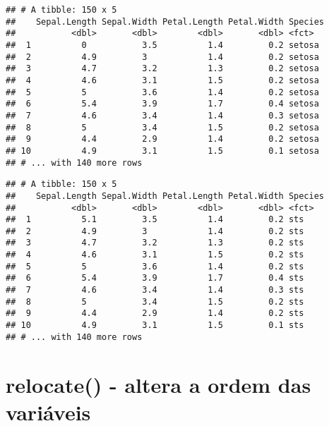 \documentclass[]{book}
\newenvironment{Shaded}{\begin{snugshade}}{\end{snugshade}}
\newcommand{\DataTypeTok}[1]{\textcolor[rgb]{0.13,0.29,0.53}{#1}}
\newcommand{\KeywordTok}[1]{\textcolor[rgb]{0.13,0.29,0.53}{\textbf{#1}}}
\newcommand{\NormalTok}[1]{#1}
\newcommand{\OperatorTok}[1]{\textcolor[rgb]{0.81,0.36,0.00}{\textbf{#1}}}
\newcommand{\StringTok}[1]{\textcolor[rgb]{0.31,0.60,0.02}{#1}}
\begin{document}
\begin{verbatim}
## # A tibble: 150 x 5
##    Sepal.Length Sepal.Width Petal.Length Petal.Width Species
##           <dbl>       <dbl>        <dbl>       <dbl> <fct>  
##  1          0           3.5          1.4         0.2 setosa 
##  2          4.9         3            1.4         0.2 setosa 
##  3          4.7         3.2          1.3         0.2 setosa 
##  4          4.6         3.1          1.5         0.2 setosa 
##  5          5           3.6          1.4         0.2 setosa 
##  6          5.4         3.9          1.7         0.4 setosa 
##  7          4.6         3.4          1.4         0.3 setosa 
##  8          5           3.4          1.5         0.2 setosa 
##  9          4.4         2.9          1.4         0.2 setosa 
## 10          4.9         3.1          1.5         0.1 setosa 
## # ... with 140 more rows
\end{verbatim}

\begin{Shaded}
\end{Shaded}

\begin{verbatim}
## # A tibble: 150 x 5
##    Sepal.Length Sepal.Width Petal.Length Petal.Width Species
##           <dbl>       <dbl>        <dbl>       <dbl> <fct>  
##  1          5.1         3.5          1.4         0.2 sts    
##  2          4.9         3            1.4         0.2 sts    
##  3          4.7         3.2          1.3         0.2 sts    
##  4          4.6         3.1          1.5         0.2 sts    
##  5          5           3.6          1.4         0.2 sts    
##  6          5.4         3.9          1.7         0.4 sts    
##  7          4.6         3.4          1.4         0.3 sts    
##  8          5           3.4          1.5         0.2 sts    
##  9          4.4         2.9          1.4         0.2 sts    
## 10          4.9         3.1          1.5         0.1 sts    
## # ... with 140 more rows
\end{verbatim}

\hypertarget{relocate---altera-a-ordem-das-variuxe1veis}{%
\section{relocate() - altera a ordem das variáveis}\label{relocate---altera-a-ordem-das-variuxe1veis}}
\end{document}
